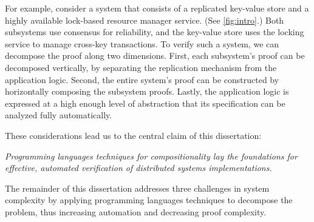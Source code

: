 For example, consider a system that consists of
  a replicated key-value store
  and a highly available lock-based resource manager service.
(See \cref{fig:intro}.)
Both subsystems use consensus for reliability,
  and the key-value store uses the locking service to manage cross-key transactions.
To verify such a system, we can decompose the proof along two dimensions.
First, each subsystem's proof can be decomposed vertically,
  by separating the replication mechanism from the application logic.
Second, the entire system's proof can be constructed
  by horizontally composing the subsystem proofs.
Lastly, the application logic is expressed at a high enough level of abstraction
  that its specification can be analyzed fully automatically.

\clearpage

These considerations lead us to the central claim of this dissertation:
\begin{center}
\emph{Programming languages techniques for compositionality
  lay the foundations for effective, automated verification of
  distributed systems implementations.
}
\end{center}

The remainder of this dissertation addresses three challenges in system complexity
  by applying programming languages techniques to decompose the problem,
  thus increasing automation and decreasing proof complexity.

